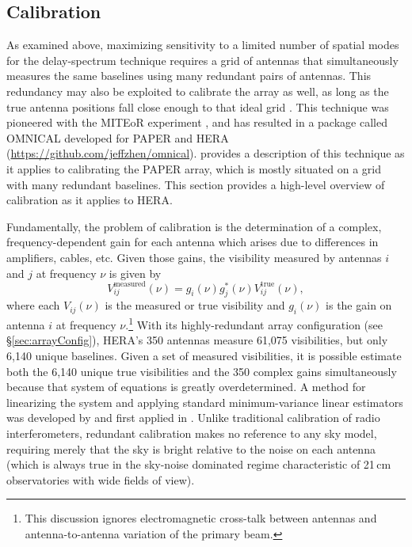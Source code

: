 \documentclass[preprint,11pt]{aastex}
\begin{document}
\subsection{Calibration}
\label{sec:calibration}
As examined above, maximizing sensitivity to a limited number of spatial modes for the delay-spectrum technique requires a grid of antennas that simultaneously measures the same baselines using many redundant pairs of antennas. This redundancy may also be exploited to calibrate the array as well, as long as the true antenna positions fall close enough to that ideal grid \citep{liu_et_al2010}. This technique was pioneered with the MITEoR experiment \citep{zheng_et_al2014}, and has resulted in a package called OMNICAL developed for PAPER and HERA (\url{https://github.com/jeffzhen/omnical}).  \citet{ali_et_al2015} provides a description of this technique as it applies to calibrating the PAPER array, which is mostly situated on a grid with many redundant baselines.  This section provides a high-level overview of calibration as it applies to HERA.

Fundamentally, the problem of calibration is the determination of a complex, frequency-dependent gain for each antenna which arises due to differences in amplifiers, cables, etc. Given those gains, the visibility measured by antennas $i$ and $j$ at frequency $\nu$ is given by 
\begin{equation}
V_{ij}^\text{measured}(\nu) = g_i(\nu) g_j^*(\nu) V_{ij}^\text{true}(\nu), 
\end{equation}
where each $V_{ij}(\nu)$ is the measured or true visibility and $g_i(\nu)$ is the gain on antenna $i$ at frequency $\nu$.\footnote{This discussion ignores electromagnetic cross-talk between antennas and antenna-to-antenna variation of the primary beam.} With its highly-redundant array configuration (see \S\ref{sec:arrayConfig}), HERA's 350 antennas measure 61,075 visibilities, but only 6,140 unique baselines. Given a set of measured visibilities, it is possible estimate both the 6,140 unique true visibilities and the 350 complex gains simultaneously because that system of equations is greatly overdetermined. A method for linearizing the system and applying standard minimum-variance linear estimators was developed by \citet{liu_et_al2010} and first applied in \citet{zheng_et_al2014}. Unlike traditional calibration of radio interferometers, redundant calibration makes no reference to any sky model, requiring merely that the sky is bright relative to the noise on each antenna (which is always true in the sky-noise dominated regime characteristic of 21\,cm observatories with wide fields of view). 
\end{document}

